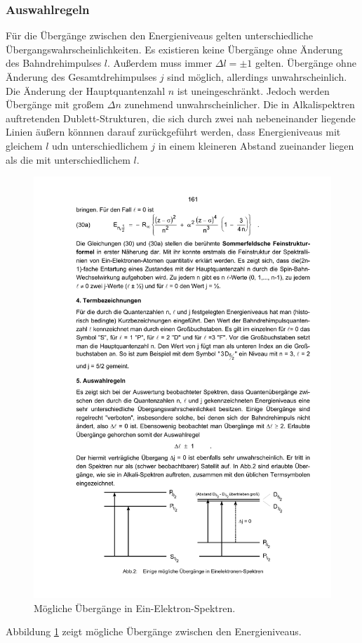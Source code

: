 \subsubsection{Auswahlregeln}
Für die Übergänge zwischen den Energieniveaus gelten unterschiedliche Übergangswahrscheinlichkeiten. Es existieren keine Übergänge ohne Änderung des Bahndrehimpulses $l$. Außerdem muss immer $\Delta l = \pm 1$ gelten. Übergänge ohne Änderung des Gesamtdrehimpulses $j$ sind möglich, allerdings unwahrscheinlich. Die Änderung der Hauptquantenzahl $n$  ist uneingeschränkt. Jedoch werden Übergänge mit großem $\Delta n$ zunehmend unwahrscheinlicher.
Die in Alkalispektren auftretenden Dublett-Strukturen, die sich durch zwei nah nebeneinander liegende Linien äußern könnnen darauf zurückgeführt werden, dass Energieniveaus mit gleichem $l$ udn unterschiedlichem $j$ in einem kleineren Abstand zueinander liegen als die mit unterschiedlichem $l$.

\begin{figure}
  \centering
  \includegraphics[scale=0.8]{content/übergänge.pdf}
\caption{Mögliche Übergänge in Ein-Elektron-Spektren\cite{anleitung605}.}
  \label{fig:übergänge}
\end{figure}
Abbildung \ref{fig:übergänge} zeigt mögliche Übergänge zwischen den Energieniveaus.


